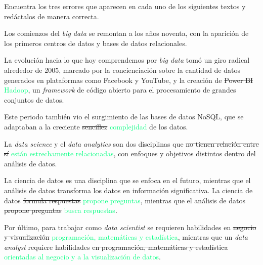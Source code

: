 {
	Encuentra los tres errores que aparecen en cada uno de los siguientes textos y redáctalos de manera correcta.
}\\

\begin{solution}
	Los comienzos del \textit{big data} se remontan a los años noventa, con la aparición de los primeros centros de datos y bases de datos relacionales.

	La evolución hacia lo que hoy comprendemos por \textit{big data} tomó un giro radical alrededor de 2005, marcado por la concienciación sobre la cantidad de datos generados en plataformas como Facebook y YouTube, y la creación de \textcolor{samuraiRed}{\sout{Power BI}} \textcolor{springGreen}{Hadoop}, un \textit{framework} de código abierto para el procesamiento de grandes conjuntos de datos.

	Este periodo también vio el surgimiento de las bases de datos NoSQL, que se adaptaban a la creciente \textcolor{samuraiRed}{\sout{sencillez}} \textcolor{springGreen}{complejidad} de los datos.

	\vspace{2em}
	\hrulefill
	\vspace{2em}

	La \textit{data science} y el \textit{data analytics} son dos disciplinas que \textcolor{samuraiRed}{\sout{no tienen relación entre sí}} \textcolor{springGreen}{están estrechamente relacionadas}, con enfoques y objetivos distintos dentro del análisis de datos.

	La ciencia de datos es una disciplina que se enfoca en el futuro, mientras que el análisis de datos transforma los datos en información significativa. La ciencia de datos \textcolor{samuraiRed}{\sout{formula respuestas}} \textcolor{springGreen}{propone preguntas}, mientras que el análisis de datos \textcolor{samuraiRed}{\sout{propone preguntas}} \textcolor{springGreen}{busca respuestas}.

	Por último, para trabajar como \textit{data scientist} se requieren habilidades en \textcolor{samuraiRed}{\sout{negocio y visualización}} \textcolor{springGreen}{programación, matemáticas y estadística}, mientras que un \textit{data analyst} requiere habilidades \textcolor{samuraiRed}{\sout{en programación, matemáticas y estadística}} \textcolor{springGreen}{orientadas al negocio y a la visualización de datos}.

\end{solution}
